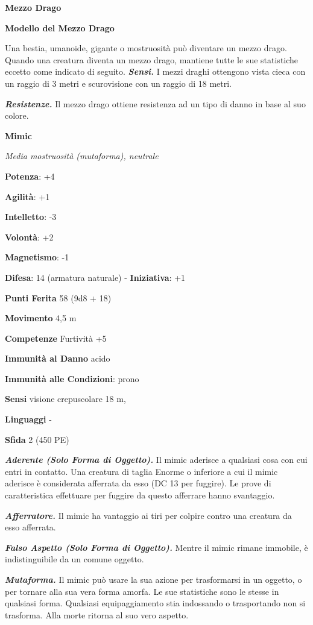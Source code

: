\begin{multicols}{2}
\textbf{Mezzo Drago}

\textbf{Modello del Mezzo Drago}

Una bestia, umanoide, gigante o mostruosità può diventare un mezzo
drago. Quando una creatura diventa un mezzo drago, mantiene tutte le sue
statistiche eccetto come indicato di seguito. \emph{\textbf{Sensi.}} I
mezzi draghi ottengono vista cieca con un raggio di 3 metri e
scurovisione con un raggio di 18 metri.

\emph{\textbf{Resistenze.}} Il mezzo drago ottiene resistenza ad un tipo
di danno in base al suo colore.

\textbf{Mimic}

\emph{Media mostruosità (mutaforma), neutrale}

\textbf{Potenza}: +4

\textbf{Agilità}: +1

\textbf{Intelletto}: -3

\textbf{Volontà}: +2

\textbf{Magnetismo}: -1

\textbf{Difesa}: 14 (armatura naturale) - \textbf{Iniziativa}: +1

\textbf{Punti Ferita} 58 (9d8 + 18)

\textbf{Movimento} 4,5 m

\textbf{Competenze} Furtività +5

\textbf{Immunità al Danno} acido

\textbf{Immunità alle Condizioni}: prono

\textbf{Sensi} visione crepuscolare 18 m, 

\textbf{Linguaggi} -

\textbf{Sfida} 2 (450 PE)\smallskip

\emph{\textbf{Aderente (Solo Forma di Oggetto).}} Il mimic aderisce a
qualsiasi cosa con cui entri in contatto. Una creatura di taglia Enorme
o inferiore a cui il mimic aderisce è considerata afferrata da esso (DC
13 per fuggire). Le prove di caratteristica effettuare per fuggire da
questo afferrare hanno svantaggio.

\emph{\textbf{Afferratore.}} Il mimic ha vantaggio ai tiri per colpire
contro una creatura da esso afferrata.

\emph{\textbf{Falso Aspetto (Solo Forma di Oggetto).}} Mentre il mimic
rimane immobile, è indistinguibile da un comune oggetto.

\emph{\textbf{Mutaforma.}} Il mimic può usare la sua azione per
trasformarsi in un oggetto, o per tornare alla sua vera forma amorfa. Le
sue statistiche sono le stesse in qualsiasi forma. Qualsiasi
equipaggiamento stia indossando o trasportando non si trasforma. Alla
morte ritorna al suo vero aspetto.


\end{multicols}

